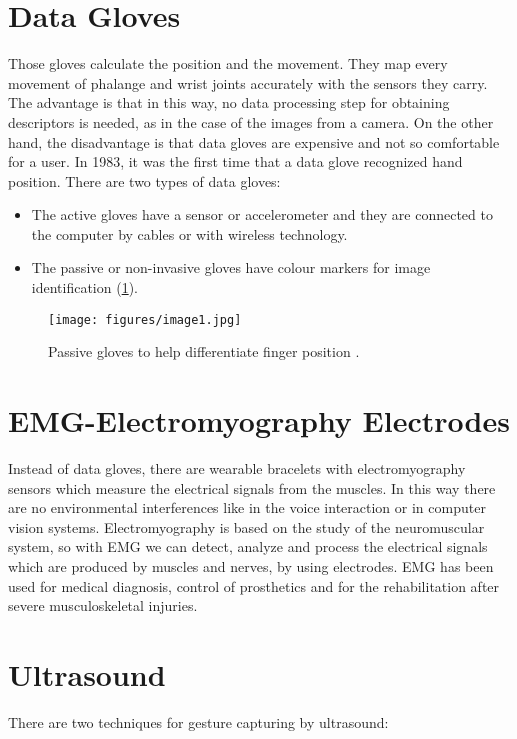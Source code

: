 \documentclass[12pt]{book}
\begin{document}
\section{Data Gloves}\label{s:sec4}
Those gloves calculate the position and the movement. They map every movement of phalange and wrist joints accurately with the sensors they carry. The advantage is that in this way, no data processing step for obtaining descriptors is needed, as in the case of the images from a camera. On the other hand, the disadvantage is that data gloves are expensive and not so comfortable for a user. In 1983, it was the first time that a data glove recognized hand position. There are two types of data gloves:

\begin{itemize}
    \item The active gloves have a sensor or accelerometer and they are connected to the computer by cables or with wireless technology. 
    \item The passive or non-invasive gloves have colour markers for image identification (\ref{fig:fig1}).
\end{itemize}

\begin{figure}[!htbp]
\centering
  \texttt{[image: figures/image1.jpg]}
  \\
  \caption{Passive gloves to help differentiate finger position \cite{JES2020} .}
  \label{fig:fig1}
\end{figure}

\section{EMG-Electromyography Electrodes}\label{s:sec5}
Instead of data gloves, there are wearable bracelets with electromyography sensors which measure the electrical signals from the muscles. In this way there are no environmental interferences like in the voice interaction or in computer vision systems. Electromyography is based on the study of the neuromuscular system, so with EMG we can detect, analyze and process the electrical signals which are produced by muscles and nerves, by using electrodes. EMG has been used for medical diagnosis, control of prosthetics and for the rehabilitation after severe musculoskeletal injuries.

\section{Ultrasound}\label{s:sec6}
There are two techniques for gesture capturing by ultrasound: 
\end{document}
